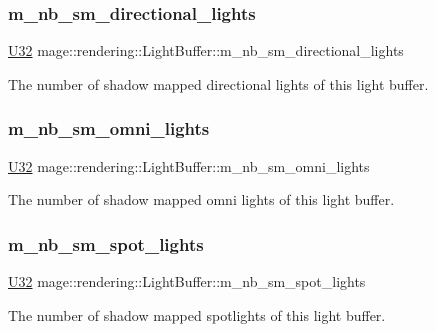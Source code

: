 \subsubsection{\texorpdfstring{m\+\_\+nb\+\_\+sm\+\_\+directional\+\_\+lights}{m\_nb\_sm\_directional\_lights}}
{\footnotesize\ttfamily \hyperlink{namespacemage_a41c104c036fba3756a74e19f793eeaa1}{U32} mage\+::rendering\+::\+Light\+Buffer\+::m\+\_\+nb\+\_\+sm\+\_\+directional\+\_\+lights}

The number of shadow mapped directional lights of this light buffer. \hypertarget{structmage_1_1rendering_1_1_light_buffer_a1a40cf5d4100b48837cae57ac2f36fcf}{}\label{structmage_1_1rendering_1_1_light_buffer_a1a40cf5d4100b48837cae57ac2f36fcf} 
\subsubsection{\texorpdfstring{m\+\_\+nb\+\_\+sm\+\_\+omni\+\_\+lights}{m\_nb\_sm\_omni\_lights}}
{\footnotesize\ttfamily \hyperlink{namespacemage_a41c104c036fba3756a74e19f793eeaa1}{U32} mage\+::rendering\+::\+Light\+Buffer\+::m\+\_\+nb\+\_\+sm\+\_\+omni\+\_\+lights}

The number of shadow mapped omni lights of this light buffer. \hypertarget{structmage_1_1rendering_1_1_light_buffer_a78481c98c9efcdf18ae1254d1fe6f776}{}\label{structmage_1_1rendering_1_1_light_buffer_a78481c98c9efcdf18ae1254d1fe6f776} 
\subsubsection{\texorpdfstring{m\+\_\+nb\+\_\+sm\+\_\+spot\+\_\+lights}{m\_nb\_sm\_spot\_lights}}
{\footnotesize\ttfamily \hyperlink{namespacemage_a41c104c036fba3756a74e19f793eeaa1}{U32} mage\+::rendering\+::\+Light\+Buffer\+::m\+\_\+nb\+\_\+sm\+\_\+spot\+\_\+lights}

The number of shadow mapped spotlights of this light buffer. \hypertarget{structmage_1_1rendering_1_1_light_buffer_aef25432813d6531689ff6a94e4cf6fcb}{}\label{structmage_1_1rendering_1_1_light_buffer_aef25432813d6531689ff6a94e4cf6fcb} 
